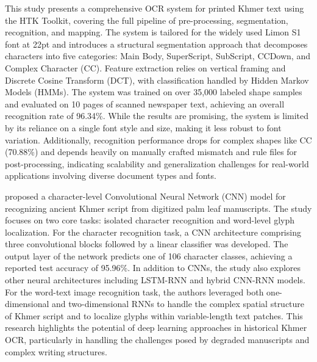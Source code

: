 {\citet{Muaz2015} This study presents a comprehensive OCR system for 
printed Khmer text using the HTK Toolkit, covering the full 
pipeline of pre-processing, segmentation, recognition, and mapping. 
The system is tailored for the widely used Limon S1 font at 22pt and 
introduces a structural segmentation approach that decomposes 
characters into five categories: Main Body, SuperScript, SubScript, 
CCDown, and Complex Character (CC). Feature extraction relies on 
vertical framing and Discrete Cosine Transform (DCT), with 
classification handled by Hidden Markov Models (HMMs). 
The system was trained on over 35,000 labeled shape samples and 
evaluated on 10 pages of scanned newspaper text, achieving an 
overall recognition rate of 96.34\%. While the results are promising, 
the system is limited by its reliance on a single font style and size, 
making it less robust to font variation. Additionally, recognition 
performance drops for complex shapes like CC (70.88\%) and depends 
heavily on manually crafted mismatch and rule files for post-processing, 
indicating scalability and generalization challenges for real-world 
applications involving diverse document types and fonts.

\citet{Valy_8563219} proposed a character-level Convolutional Neural 
Network (CNN) model for recognizing ancient Khmer script from digitized 
palm leaf manuscripts. The study focuses on two core tasks: 
isolated character recognition and word-level glyph localization. 
For the character recognition task, a CNN architecture comprising 
three convolutional blocks followed by a linear classifier was 
developed. The output layer of the network predicts one of 106 
character classes, achieving a reported test accuracy of 95.96\%. 
In addition to CNNs, the study also explores other neural 
architectures including LSTM-RNN and hybrid CNN-RNN models. 
For the word-text image recognition task, the authors leveraged 
both one-dimensional and two-dimensional RNNs to handle the complex 
spatial structure of Khmer script and to localize glyphs within 
variable-length text patches. This research highlights the potential 
of deep learning approaches in historical Khmer OCR, particularly in 
handling the challenges posed by degraded manuscripts and complex 
writing structures.

}
